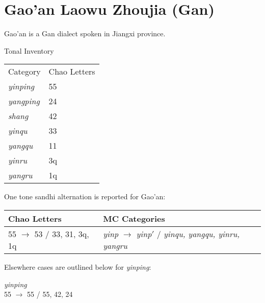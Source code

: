 \documentclass{article}
\begin{document}
\section{Gao'an Laowu Zhoujia (Gan)}
Gao'an is a Gan dialect spoken in Jiangxi province.\cite{Yan1981}
\begin{exe}
\ex Tonal Inventory \\
\begin{tabular}[t]{|ll|}
\hline
Category & Chao Letters \\
\textit{yinping} & 55 \\
\textit{yangping} & 24 \\
\textit{shang} & 42 \\
\textit{yinqu} &  33 \\
\textit{yangqu} & 11 \\
\textit{yinru} & 3q \\
\textit{yangru} & 1q \\
\hline
\end{tabular}
\end{exe}
One tone sandhi alternation is reported for Gao'an:
\begin{exe}
\ex
\begin{tabular}[t]{ll}
Chao Letters & MC Categories \\
\hline
55 $\rightarrow$ 53 / \underline{\hspace{1em}} 33, 31, 3q, 1q & \textit{yinp} $\rightarrow$ \textit{yinp}$'$ / \underline{\hspace{1em}} \textit{yinqu, yangqu, yinru, yangru} \\ 
\end{tabular}
\end{exe}
Elsewhere cases are outlined below for \textit{yinping}:
\begin{exe}
\ex 
\begin{xlist}
\ex \textit{yinping} \\
55 $\rightarrow$ 55 / \underline{\hspace{1em}} 55, 42, 24
\end{xlist}
\end{exe}
\end{document}
